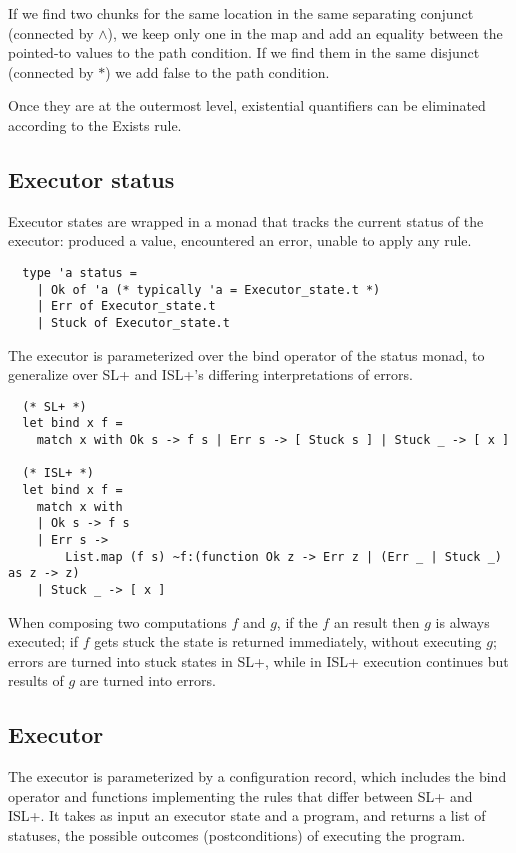 \documentclass[parskip=half]{scrartcl}
\begin{document}
If we find two chunks for the same location in the same separating conjunct (\ie connected by \(\wedge\)), we keep only one in the  map and add an equality between the pointed-to values to the path condition. If we find them in the same disjunct (connected by \(\ast\)) we add false to the path condition.

Once they are at the outermost level, existential quantifiers can be eliminated according to the Exists rule.

\subsection{Executor status}

Executor states are wrapped in a monad that tracks the current status of the executor: produced a value, encountered an error, unable to apply any rule.

\begin{verbatim}
  type 'a status =
    | Ok of 'a (* typically 'a = Executor_state.t *)
    | Err of Executor_state.t
    | Stuck of Executor_state.t
\end{verbatim}

The executor is parameterized over the bind operator of the status monad, to generalize over SL+ and ISL+'s differing interpretations of errors.

\begin{verbatim}
  (* SL+ *)
  let bind x f =
    match x with Ok s -> f s | Err s -> [ Stuck s ] | Stuck _ -> [ x ]

  (* ISL+ *)
  let bind x f =
    match x with
    | Ok s -> f s
    | Err s ->
        List.map (f s) ~f:(function Ok z -> Err z | (Err _ | Stuck _) as z -> z)
    | Stuck _ -> [ x ]
\end{verbatim}

When composing two computations \(f\) and \(g\), if the \(f\) an  result then \(g\) is always executed; if \(f\) gets stuck the state is returned immediately, without executing \(g\); errors are turned into stuck states in SL+, while in ISL+ execution continues but  results of \(g\) are turned into errors.

\subsection{Executor}

The executor is parameterized by a configuration record, which includes the bind operator and functions implementing the rules that differ between SL+ and ISL+. It takes as input an executor state and a program, and returns a list of statuses, the possible outcomes (postconditions) of executing the program.
\end{document}
